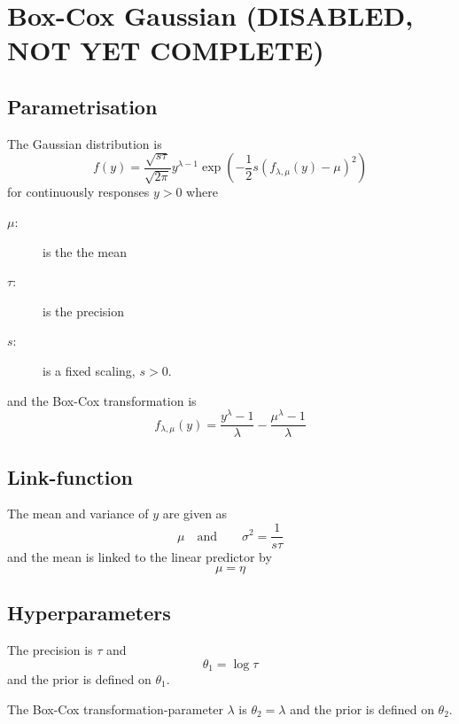 \documentclass[a4paper,11pt]{article}
\begin{document}
\section*{Box-Cox Gaussian (DISABLED, NOT YET COMPLETE)}

\subsection*{Parametrisation}

The Gaussian distribution is
\begin{displaymath}
    f(y) = \frac{\sqrt{s\tau}}{\sqrt{2\pi}} y^{\lambda-1} \exp\left( -\frac{1}{2}
      s\left(f_{\lambda,\mu}(y)-\mu\right)^{2}\right) 
\end{displaymath}
for continuously responses $y>0$ where
\begin{description}
\item[$\mu$:] is the the mean
\item[$\tau$:] is the precision
\item[$s$:] is a fixed scaling, $s>0$.
\end{description}
and the Box-Cox transformation is
\begin{displaymath}
    f_{\lambda,\mu}(y) = \frac{y^{\lambda}-1}{\lambda} - \frac{\mu^{\lambda} -1}{\lambda}
\end{displaymath}


\subsection*{Link-function}

The mean and variance of $y$ are given as
\begin{displaymath}
    \mu \quad\text{and}\qquad \sigma^{2} = \frac{1}{s\tau}
\end{displaymath}
and the mean is linked to the linear predictor by
\begin{displaymath}
    \mu = \eta
\end{displaymath}

\subsection*{Hyperparameters}

The precision is $\tau$ and 
\begin{displaymath}
    \theta_1 = \log \tau
\end{displaymath}
and the prior is defined on $\theta_1$.

The Box-Cox transformation-parameter $\lambda$ is 
$\theta_2 = \lambda$
and the prior is defined on $\theta_2$.
\end{document}

